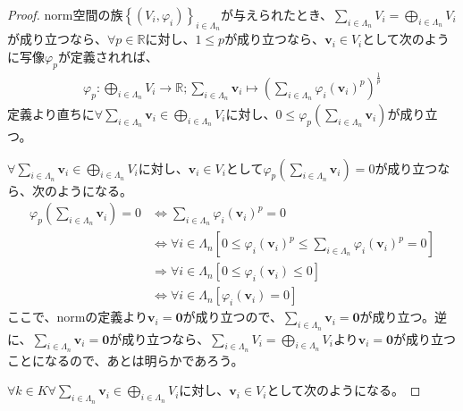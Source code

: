 \documentclass[dvipdfmx]{jsarticle}
\begin{document}
\begin{proof}
norm空間の族$\left\{ \left( V_{i},\varphi_{i} \right) \right\}_{i \in \varLambda_{n}}$が与えられたとき、$\sum_{i \in \varLambda_{n}} V_{i} = \bigoplus_{i \in \varLambda_{n}} V_{i}$が成り立つなら、$\forall p \in \mathbb{R}$に対し、$1 \leq p$が成り立つなら、$\mathbf{v}_{i} \in V_{i}$として次のように写像$\varphi_{p}$が定義されれば、
\begin{align*}
\varphi_{p}:\bigoplus_{i \in \varLambda_{n}} V_{i} \rightarrow \mathbb{R};\sum_{i \in \varLambda_{n}} \mathbf{v}_{i} \mapsto \left( \sum_{i \in \varLambda_{n}} {\varphi_{i}\left( \mathbf{v}_{i} \right)}^{p} \right)^{\frac{1}{p}}
\end{align*}
定義より直ちに$\forall\sum_{i \in \varLambda_{n}} \mathbf{v}_{i} \in \bigoplus_{i \in \varLambda_{n}} V_{i}$に対し、$0 \leq \varphi_{p}\left( \sum_{i \in \varLambda_{n}} \mathbf{v}_{i} \right)$が成り立つ。\par
$\forall\sum_{i \in \varLambda_{n}} \mathbf{v}_{i} \in \bigoplus_{i \in \varLambda_{n}} V_{i}$に対し、$\mathbf{v}_{i} \in V_{i}$として$\varphi_{p}\left( \sum_{i \in \varLambda_{n}} \mathbf{v}_{i} \right) = 0$が成り立つなら、次のようになる。
\begin{align*}
\varphi_{p}\left( \sum_{i \in \varLambda_{n}} \mathbf{v}_{i} \right) = 0 &\Leftrightarrow \sum_{i \in \varLambda_{n}} {\varphi_{i}\left( \mathbf{v}_{i} \right)}^{p} = 0\\
&\Leftrightarrow \forall i \in \varLambda_{n}\left[ 0 \leq {\varphi_{i}\left( \mathbf{v}_{i} \right)}^{p} \leq \sum_{i \in \varLambda_{n}} {\varphi_{i}\left( \mathbf{v}_{i} \right)}^{p} = 0 \right]\\
&\Rightarrow \forall i \in \varLambda_{n}\left[ 0 \leq \varphi_{i}\left( \mathbf{v}_{i} \right) \leq 0 \right]\\
&\Leftrightarrow \forall i \in \varLambda_{n}\left[ \varphi_{i}\left( \mathbf{v}_{i} \right) = 0 \right]
\end{align*}
ここで、normの定義より$\mathbf{v}_{i} = \mathbf{0}$が成り立つので、$\sum_{i \in \varLambda_{n}} \mathbf{v}_{i} = \mathbf{0}$が成り立つ。逆に、$\sum_{i \in \varLambda_{n}} \mathbf{v}_{i} = \mathbf{0}$が成り立つなら、$\sum_{i \in \varLambda_{n}} V_{i} = \bigoplus_{i \in \varLambda_{n}} V_{i}$より$\mathbf{v}_{i} = \mathbf{0}$が成り立つことになるので、あとは明らかであろう。\par
$\forall k \in K\forall\sum_{i \in \varLambda_{n}} \mathbf{v}_{i} \in \bigoplus_{i \in \varLambda_{n}} V_{i}$に対し、$\mathbf{v}_{i} \in V_{i}$として次のようになる。

\end{proof}
\end{document}
